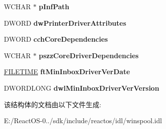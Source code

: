 \begin{DoxyCompactItemize}
W\+C\+H\+AR $\ast$ {\bfseries p\+Inf\+Path}
\item 
\mbox{\label{struct___w_i_n_s_p_o_o_l___d_r_i_v_e_r___i_n_f_o__8_a7030f40042972c129d62a4e57186041a}} 
D\+W\+O\+RD {\bfseries dw\+Printer\+Driver\+Attributes}
\item 
\mbox{\label{struct___w_i_n_s_p_o_o_l___d_r_i_v_e_r___i_n_f_o__8_a31c379cfdde232fd41290b86080007e8}} 
D\+W\+O\+RD {\bfseries cch\+Core\+Dependencies}
\item 
\mbox{\label{struct___w_i_n_s_p_o_o_l___d_r_i_v_e_r___i_n_f_o__8_a77d8ece6d75eb1d2224f13e9afd60bdf}} 
W\+C\+H\+AR $\ast$ {\bfseries pszz\+Core\+Driver\+Dependencies}
\item 
\mbox{\label{struct___w_i_n_s_p_o_o_l___d_r_i_v_e_r___i_n_f_o__8_ab314741b48a5d46ecd23fee9ca48ddaa}} 
\hyperlink{struct___f_i_l_e_t_i_m_e}{F\+I\+L\+E\+T\+I\+ME} {\bfseries ft\+Min\+Inbox\+Driver\+Ver\+Date}
\item 
\mbox{\label{struct___w_i_n_s_p_o_o_l___d_r_i_v_e_r___i_n_f_o__8_a149b85294bfc13b84ed25acc94f59edc}} 
D\+W\+O\+R\+D\+L\+O\+NG {\bfseries dwl\+Min\+Inbox\+Driver\+Ver\+Version}
\end{DoxyCompactItemize}


该结构体的文档由以下文件生成\+:\begin{DoxyCompactItemize}
\item 
E\+:/\+React\+O\+S-\/0../sdk/include/reactos/idl/winspool.\+idl\end{DoxyCompactItemize}
